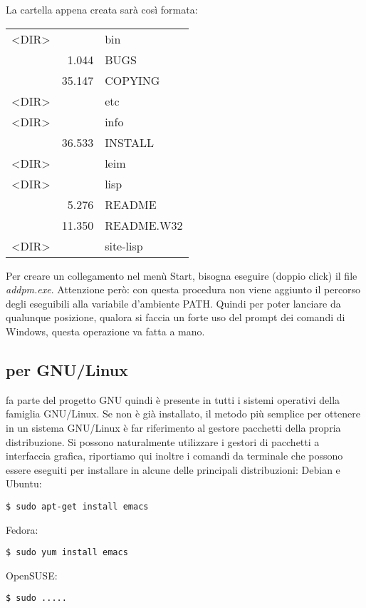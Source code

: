 \documentclass[10pt,a4paper]{article}
\begin{document}
La cartella appena creata sarà così formata:
\begin{center}\ttfamily
 \begin{tabular}{lrl}
  <DIR>&        & bin       \\
       &  1.044 & BUGS      \\
       & 35.147 & COPYING   \\
  <DIR>&        & etc       \\
  <DIR>&        & info      \\
       & 36.533 & INSTALL   \\
  <DIR>&        & leim      \\
  <DIR>&        & lisp      \\
       &  5.276 & README    \\
       & 11.350 & README.W32\\
  <DIR>&        & site-lisp \\
 \end{tabular}
\end{center}

Per creare un collegamento nel menù \textsf{Start}, bisogna
eseguire (doppio click) il file \emph{addpm.exe}. Attenzione però: con questa
procedura non viene aggiunto il percorso degli eseguibili alla  
variabile d'ambiente \textsf{PATH}. Quindi per poter lanciare 
\emacs{} da qualunque posizione, qualora si faccia un forte uso del prompt dei
comandi di Windows, questa operazione va fatta a mano.

\subsection*{\emacs{} per GNU/Linux}
\label{sec:installlinux}
\emacs{} fa parte del progetto GNU quindi è presente in tutti i sistemi
operativi della famiglia GNU/Linux. Se non è già installato, il metodo più
semplice per ottenere \emacs{} in un sistema GNU/Linux è far riferimento al
gestore pacchetti della propria distribuzione. Si possono naturalmente
utilizzare i gestori di pacchetti a interfaccia grafica, riportiamo qui inoltre
i comandi da terminale che possono essere eseguiti per installare \emacs{} in
alcune delle principali distribuzioni: Debian e Ubuntu:
\begin{verbatim}
$ sudo apt-get install emacs
\end{verbatim}
Fedora:
\begin{verbatim}
$ sudo yum install emacs
\end{verbatim}
OpenSUSE: %
\begin{verbatim}
$ sudo ..... 
\end{verbatim}
\end{document}
